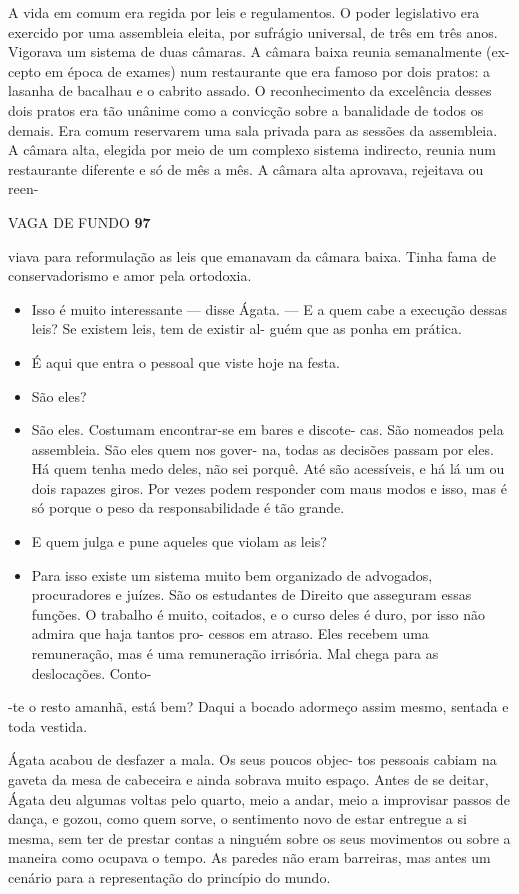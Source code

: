 A vida em comum era regida por leis e regulamentos. O poder legislativo
era exercido por uma assembleia eleita, por sufrágio universal, de três
em três anos. Vigorava um sistema de duas câmaras. A câmara baixa reunia
semanalmente (ex- cepto em época de exames) num restaurante que era
famoso por dois pratos: a lasanha de bacalhau e o cabrito assado. O
reconhecimento da excelência desses dois pratos era tão unânime como a
convicção sobre a banalidade de todos os demais. Era comum reservarem
uma sala privada para as sessões da assembleia. A câmara alta, elegida
por meio de um complexo sistema indirecto, reunia num restaurante
diferente e só de mês a mês. A câmara alta aprovava, rejeitava ou reen-

VAGA DE FUNDO \textbf{97}

viava para reformulação as leis que emanavam da câmara baixa. Tinha fama
de conservadorismo e amor pela ortodoxia.

\begin{itemize}
\tightlist
\item
  Isso é muito interessante --- disse Ágata. --- E a quem cabe a
  execução dessas leis? Se existem leis, tem de existir al- guém que as
  ponha em prática.
\item
  É aqui que entra o pessoal que viste hoje na festa.
\item
  São eles?
\item
  São eles. Costumam encontrar-se em bares e discote- cas. São nomeados
  pela assembleia. São eles quem nos gover- na, todas as decisões passam
  por eles. Há quem tenha medo deles, não sei porquê. Até são
  acessíveis, e há lá um ou dois rapazes giros. Por vezes podem
  responder com maus modos e isso, mas é só porque o peso da
  responsabilidade é tão grande.
\item
  E quem julga e pune aqueles que violam as leis?
\item
  Para isso existe um sistema muito bem organizado de advogados,
  procuradores e juízes. São os estudantes de Direito que asseguram
  essas funções. O trabalho é muito, coitados, e o curso deles é duro,
  por isso não admira que haja tantos pro- cessos em atraso. Eles
  recebem uma remuneração, mas é uma remuneração irrisória. Mal chega
  para as deslocações. Conto-
\end{itemize}

-te o resto amanhã, está bem? Daqui a bocado adormeço assim mesmo,
sentada e toda vestida.

Ágata acabou de desfazer a mala. Os seus poucos objec- tos pessoais
cabiam na gaveta da mesa de cabeceira e ainda sobrava muito espaço.
Antes de se deitar, Ágata deu algumas voltas pelo quarto, meio a andar,
meio a improvisar passos de dança, e gozou, como quem sorve, o
sentimento novo de estar entregue a si mesma, sem ter de prestar contas
a ninguém sobre os seus movimentos ou sobre a maneira como ocupava o
tempo. As paredes não eram barreiras, mas antes um cenário para a
representação do princípio do mundo.

